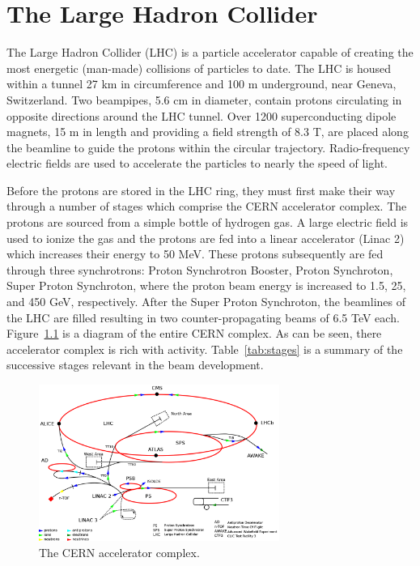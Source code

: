 \chapter{The Large Hadron Collider}
\label{chap:lhc}

The Large Hadron Collider (LHC) is a particle accelerator capable of creating the most energetic (man-made) collisions of particles to date. The LHC is housed within a tunnel 27 km in circumference and 100 m underground, near Geneva, Switzerland. Two beampipes, 5.6 cm in diameter, contain protons circulating in opposite directions around the LHC tunnel. Over 1200 superconducting dipole magnets, 15 m in length and providing a field strength of 8.3 T, are placed along the beamline to guide the protons within the circular trajectory. Radio-frequency electric fields are used to accelerate the particles to nearly the speed of light.

Before the protons are stored in the LHC ring, they must first make their way through a number of stages which comprise the CERN accelerator complex. The protons are sourced from a simple bottle of hydrogen gas. A large electric field is used to ionize the gas and the protons are fed into a linear accelerator (Linac 2) which increases their energy to 50 MeV. These protons subsequently are fed through three synchrotrons: Proton Synchrotron Booster, Proton Synchroton, Super Proton Synchroton, where the proton beam energy is increased to 1.5, 25, and 450 GeV, respectively. After the Super Proton Synchroton, the beamlines of the LHC are filled resulting in two counter-propagating beams of 6.5 TeV each. Figure~\ref{fig:lhc} is a diagram of the entire CERN complex. As can be seen, there accelerator complex is rich with activity. Table~\ref{tab:stages} is a summary of the successive stages relevant in the beam development.

\begin{figure}
\centering
\includegraphics[width=0.7\textwidth]{figs/lhcschematic.png}
\caption{The CERN accelerator complex.}
\label{fig:lhc}
\end{figure}

